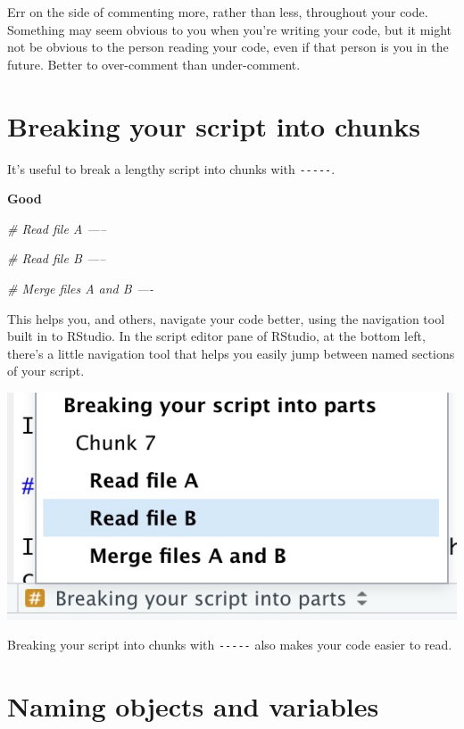 \documentclass[]{book}
\newenvironment{Shaded}{\begin{snugshade}}{\end{snugshade}}
\newcommand{\CommentTok}[1]{\textcolor[rgb]{0.56,0.35,0.01}{\textit{#1}}}
\begin{document}
Err on the side of commenting more, rather than less, throughout your code. Something may seem obvious to you when you're writing your code, but it might not be obvious to the person reading your code, even if that person is you in the future. Better to over-comment than under-comment.

\hypertarget{breaking-your-script-into-chunks}{%
\section{Breaking your script into chunks}\label{breaking-your-script-into-chunks}}

It's useful to break a lengthy script into chunks with \texttt{-\/-\/-\/-\/-}.

\textbf{Good}

\begin{Shaded}
\begin{Highlighting}[]
\CommentTok{# Read file A -----}


\CommentTok{# Read file B -----}

\CommentTok{# Merge files A and B ----}
\end{Highlighting}
\end{Shaded}

This helps you, and others, navigate your code better, using the navigation tool built in to RStudio. In the script editor pane of RStudio, at the bottom left, there's a little navigation tool that helps you easily jump between named sections of your script.

\includegraphics[width=7.64in]{atlas/rstudio_navigation}

Breaking your script into chunks with \texttt{-\/-\/-\/-\/-} also makes your code easier to read.

\hypertarget{naming-objects-and-variables}{%
\section{Naming objects and variables}\label{naming-objects-and-variables}}
\end{document}

